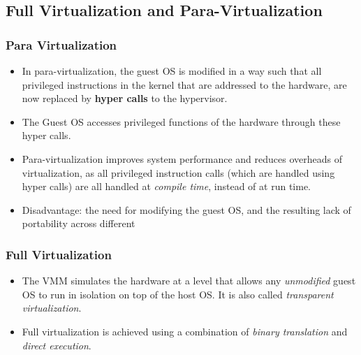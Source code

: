 \documentclass{article}
\begin{document}
\subsection{Full Virtualization and Para-Virtualization}
\subsubsection{Para Virtualization}
\begin{itemize}
    \item In para-virtualization, the guest OS is modified in a way such that all privileged instructions in the kernel that are addressed to the hardware, are now replaced by \textbf{hyper calls} to the hypervisor. 
    
    \item The Guest OS accesses privileged functions of the hardware through these hyper calls. 
    
    \item Para-virtualization improves system performance and reduces overheads of virtualization,  as all privileged instruction calls (which are handled using hyper calls) are all handled at \textit{compile time}, instead of at run time.
    
    \item Disadvantage: the need for modifying the guest OS, and the resulting lack of portability across different 
\end{itemize}

\subsubsection{Full Virtualization}
\begin{itemize}
    \item The VMM simulates the hardware at a level that allows any \textit{unmodified} guest OS to run in isolation on top of the host OS. It is also called \textit{transparent virtualization}. 
    
    \item Full virtualization is achieved using a combination of \textit{binary translation} and \textit{direct execution}. 
\end{itemize}
\end{document}
